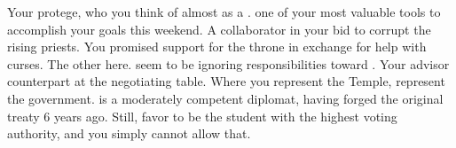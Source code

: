 \documentclass[char]{GL2020}
\begin{document}
\begin{contacts}
	\contact{\cScholarship{}} Your protege, who you think of almost as a \cScholarship{\child}. \cScholarship{\They} \cScholarship{\are} one of your most valuable tools to accomplish your goals this weekend.
\contact{\cPrince{}} A collaborator in your bid to corrupt the rising \pShip{} priests. You promised support for the throne in exchange for \cPrince{\their} help with curses.
	\contact{\cBeetle{}} The other \cBeetle{\cleric} here. \cBeetle{\They} seem to be ignoring \cBeetle{\their} responsibilities toward \pTech{}.
	\contact{\cDiplomat{}} Your advisor counterpart at the negotiating table. Where you represent the Temple, \cDiplomat{\they} represent\cDiplomat{\plural} the government. \cDiplomat{} is a moderately competent diplomat, having forged the original treaty 6 years ago. Still, \cDiplomat{\they} favor \cHeir{} to be the student with the highest voting authority, and you simply cannot allow that.
\end{contacts}
\end{document}
